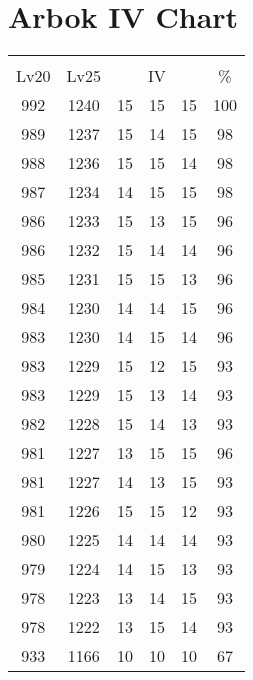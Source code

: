 \documentclass{article}%
\begin{document}
%
\normalsize%
\section{Arbok IV Chart}%
\label{sec:Arbok IV Chart}%
\renewcommand{\arraystretch}{1.5}%
\begin{tabular}{|c|c|c|c|c|c|}%
\hline%
\multicolumn{6}{|c|}{\textcolor{white}{ 
\linebreak{Arbok}
}%
\cellcolor{black}}\\%
\multicolumn{1}{|c}{Lv20}&\multicolumn{1}{c|}{Lv25}&\multicolumn{3}{c|}{IV}&\multicolumn{1}{|c|}{\%}\\%
\hline%
\rowcolor{color100}%
992&1240&15&15&15&100\\%
\hline%
\rowcolor{color98}%
989&1237&15&14&15&98\\%
\hline%
\rowcolor{color98}%
988&1236&15&15&14&98\\%
\hline%
\rowcolor{color98}%
987&1234&14&15&15&98\\%
\hline%
\rowcolor{color96}%
986&1233&15&13&15&96\\%
\hline%
\rowcolor{color96}%
986&1232&15&14&14&96\\%
\hline%
\rowcolor{color96}%
985&1231&15&15&13&96\\%
\hline%
\rowcolor{color96}%
984&1230&14&14&15&96\\%
\hline%
\rowcolor{color96}%
983&1230&14&15&14&96\\%
\hline%
\rowcolor{color93}%
983&1229&15&12&15&93\\%
\hline%
\rowcolor{color93}%
983&1229&15&13&14&93\\%
\hline%
\rowcolor{color93}%
982&1228&15&14&13&93\\%
\hline%
\rowcolor{color96}%
981&1227&13&15&15&96\\%
\hline%
\rowcolor{color93}%
981&1227&14&13&15&93\\%
\hline%
\rowcolor{color93}%
981&1226&15&15&12&93\\%
\hline%
\rowcolor{color93}%
980&1225&14&14&14&93\\%
\hline%
\rowcolor{color93}%
979&1224&14&15&13&93\\%
\hline%
\rowcolor{color93}%
978&1223&13&14&15&93\\%
\hline%
\rowcolor{color93}%
978&1222&13&15&14&93\\%
\hline%
\rowcolor{color91}%
933&1166&10&10&10&67\\%
\end{tabular}

%
\end{document}
